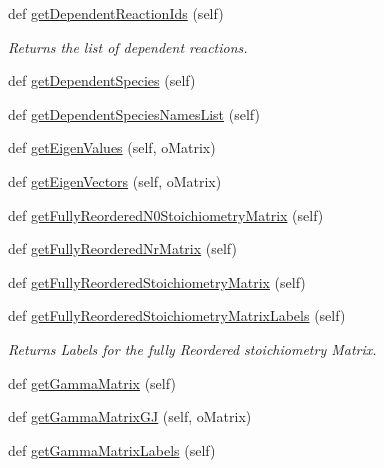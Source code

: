 \begin{DoxyCompactItemize}
\item 
def \hyperlink{classstructural_1_1_lib_structural_ab444b82b1879edd105eb3e6f48201bbd}{get\+Dependent\+Reaction\+Ids} (self)
\begin{DoxyCompactList}\small\item\em Returns the list of dependent reactions. \end{DoxyCompactList}\item 
def \hyperlink{classstructural_1_1_lib_structural_a4c8ac4fd15963f52ddd713409927a0cf}{get\+Dependent\+Species} (self)
\item 
def \hyperlink{classstructural_1_1_lib_structural_a3bd612a623b126eeb5100977c1f978ce}{get\+Dependent\+Species\+Names\+List} (self)
\item 
def \hyperlink{classstructural_1_1_lib_structural_a5818b6ddbf73bdb16fc484d113396efd}{get\+Eigen\+Values} (self, o\+Matrix)
\item 
def \hyperlink{classstructural_1_1_lib_structural_ac889ed771a0c7097bd81d1e4026223fd}{get\+Eigen\+Vectors} (self, o\+Matrix)
\item 
def \hyperlink{classstructural_1_1_lib_structural_ae5f4d7d9de4cd56caf92e420b4c94056}{get\+Fully\+Reordered\+N0\+Stoichiometry\+Matrix} (self)
\item 
def \hyperlink{classstructural_1_1_lib_structural_a36300be8404c4952f812f00cdf05e446}{get\+Fully\+Reordered\+Nr\+Matrix} (self)
\item 
def \hyperlink{classstructural_1_1_lib_structural_a28b5d6e4db50a307e7ad2e2c3f25a3bf}{get\+Fully\+Reordered\+Stoichiometry\+Matrix} (self)
\item 
def \hyperlink{classstructural_1_1_lib_structural_a4b427a6182e286e5e9286664b8c90b10}{get\+Fully\+Reordered\+Stoichiometry\+Matrix\+Labels} (self)
\begin{DoxyCompactList}\small\item\em Returns Labels for the fully Reordered stoichiometry Matrix. \end{DoxyCompactList}\item 
def \hyperlink{classstructural_1_1_lib_structural_af46ef451e4797bfeaf9625652702b2c3}{get\+Gamma\+Matrix} (self)
\item 
def \hyperlink{classstructural_1_1_lib_structural_a548930daec871db97f9223654b0a69fd}{get\+Gamma\+Matrix\+GJ} (self, o\+Matrix)
\item 
def \hyperlink{classstructural_1_1_lib_structural_aa925852506073af47f7649949036e1e9}{get\+Gamma\+Matrix\+Labels} (self)
\item 

\end{DoxyCompactItemize}
